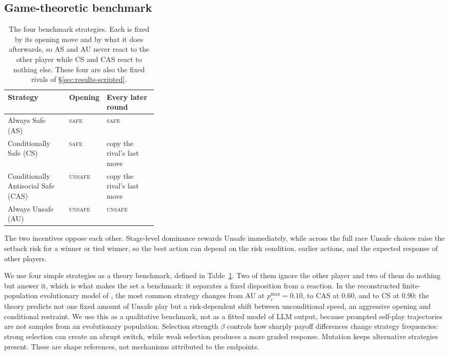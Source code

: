 \documentclass[sigconf,anonymous]{aamas}
\newcommand{\Safe}{\textsc{safe}}
\newcommand{\Unsafe}{\textsc{unsafe}}
\begin{document}
\subsection{Game-theoretic benchmark}
\label{sec:theory-benchmark}

\begin{table}[t]
\caption{The four benchmark strategies. Each is fixed by its opening move and
by what it does afterwards, so AS and AU never react to the other player while
CS and CAS react to nothing else. These four are also the fixed rivals of
\S\ref{sec:results-scripted}.}
\label{tab:benchmark-strategies}
\centering
\footnotesize
\begin{tabular}{@{}llp{0.34\linewidth}@{}}
\toprule
Strategy & Opening & Every later round \\
\midrule
Always Safe (AS) & \Safe{} & \Safe{} \\
Conditionally Safe (CS) & \Safe{} & copy the rival's last move \\
Conditionally Antisocial Safe (CAS) & \Unsafe{} & copy the rival's last move \\
Always Unsafe (AU) & \Unsafe{} & \Unsafe{} \\
\bottomrule
\end{tabular}
\end{table}


The two incentives oppose each other. Stage-level dominance rewards Unsafe
immediately, while across the full race Unsafe choices raise the setback risk
for a winner or tied winner, so the best action can depend on the risk
condition, earlier actions, and the expected response of other players.

We use four simple strategies as a theory benchmark, defined in
Table~\ref{tab:benchmark-strategies}. Two of them ignore the other player and
two of them do nothing but answer it, which is what makes the set a benchmark:
it separates a fixed disposition from a reaction. In the reconstructed finite-population evolutionary model of
\citet{falling_behind_unsafe}, the most common strategy changes from AU at
$p_r^{\max}=0.10$, to CAS at $0.60$, and to CS at $0.90$: the theory predicts
not one fixed amount of Unsafe play but a risk-dependent shift between
unconditional speed, an aggressive opening and conditional restraint. We use
this as a qualitative benchmark, not as a fitted model of LLM output, because
prompted self-play trajectories are not samples from an evolutionary
population.
Selection strength $\beta$ controls how sharply payoff differences change
strategy frequencies: strong selection can create an abrupt switch, while weak
selection produces a more graded response. Mutation keeps alternative strategies
present. These are shape references, not mechanisms attributed to the endpoints.
\end{document}
